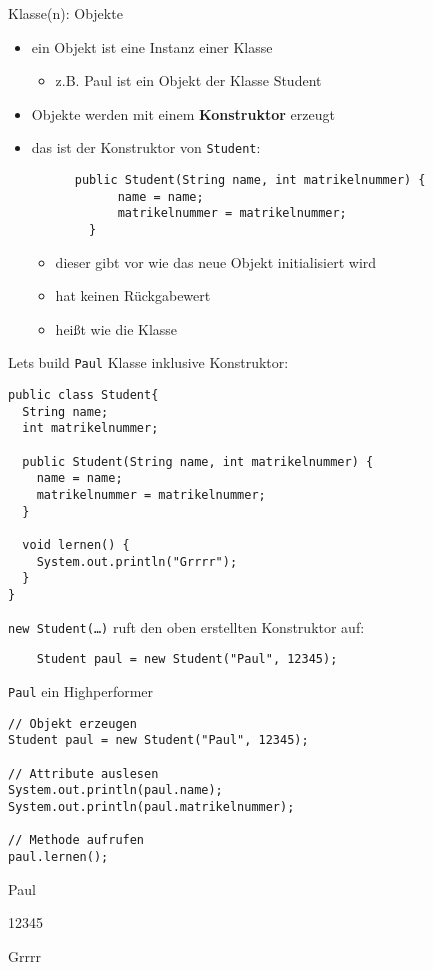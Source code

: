 \documentclass{../../presentation}
\begin{document}
\begin{frame}[fragile]{Klasse(n): Objekte}
  \begin{itemize}
    \item ein Objekt ist eine Instanz einer Klasse
      \begin{itemize}
        \item[\textbullet] z.B. Paul ist ein Objekt der Klasse Student
      \end{itemize}
    \item Objekte werden mit einem \textbf{Konstruktor} erzeugt 
    \item das ist der Konstruktor von \texttt{Student}:
      \begin{verbatim}
      public Student(String name, int matrikelnummer) {
		    name = name;
		    matrikelnummer = matrikelnummer;
		}
      \end{verbatim}
      \begin{itemize}
        \item[\textbullet]dieser gibt vor wie das neue Objekt initialisiert wird 
        \item[\textbullet]hat keinen Rückgabewert 
        \item[\textbullet]heißt wie die Klasse
      \end{itemize}
\end{itemize}
\end{frame}

\begin{frame}[fragile]{Let\textquotesingle s build \texttt{Paul}}
  Klasse inklusive Konstruktor:
  \begin{verbatim}
public class Student{
  String name;
  int matrikelnummer;
    
  public Student(String name, int matrikelnummer) {
    name = name;
    matrikelnummer = matrikelnummer;
  }

  void lernen() {
    System.out.println("Grrrr");
  }
}
  \end{verbatim}
  \texttt{new Student(\dots)} ruft den oben erstellten Konstruktor auf:
  \begin{verbatim}
    Student paul = new Student("Paul", 12345);
  \end{verbatim}
\end{frame}

\begin{frame}[fragile]{\texttt{Paul} ein Highperformer}
  \begin{verbatim}
// Objekt erzeugen
Student paul = new Student("Paul", 12345);

// Attribute auslesen
System.out.println(paul.name);
System.out.println(paul.matrikelnummer);

// Methode aufrufen
paul.lernen();
\end{verbatim}

\begin{ausgabe}
  Paul

  12345

  Grrrr
\end{ausgabe}
\end{frame}
\end{document}
